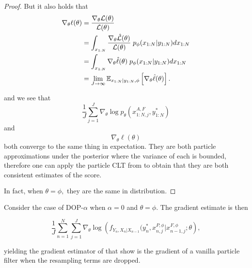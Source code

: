 \documentclass{article}
\begin{document}
\begin{proof}
    But it also holds that
    \begin{align*}
        \nabla_\theta \ell(\theta)
        &= \frac{\nabla_\theta \mathcal{L}(\theta)}{\mathcal{L}(\theta)} \\
        &= \int_{x_{1:N}} \frac{\nabla_\theta \hat{\mathcal{L}}(\theta)}{\mathcal{L}(\theta)} \;p_\phi(x_{1:N}|y_{1:N})dx_{1:N} \\
        &= \int_{x_{1:N}} \nabla_\theta \hat\ell(\theta) \;p_\phi(x_{1:N}|y_{1:N})dx_{1:N}\\
        &= \lim_{J\to\infty} \mathbb{E}_{x_{1:N}|y_{1:N}, \phi}\left[\nabla_\theta \hat\ell(\theta)\right].
    \end{align*}

    and we see that $$\frac{1}{J}\sum_{j=1}^J\nabla_\theta \log p_\theta(x_{1:N,j}^{A,F},y_{1:N}^*)$$ and $$\nabla_\theta \hat\ell(\theta)$$ both converge to the same thing in expectation. They are both particle approximations under the posterior where the variance of each is bounded, therefore one can apply the particle CLT from \cite{chopin2004clt} to obtain that they are both consistent estimates of the score.

    In fact, when $\theta=\phi,$ they are the same in distribution. 

\end{proof}


\begin{lem}

Consider the case of DOP-$\alpha$ when $\alpha=0$ and $\theta=\phi$. The gradient estimate is then

    \begin{equation}
        \frac{1}{J} \sum_{n=1}^N \sum_{j=1}^J \nabla_\theta \log\left(f_{Y_n,X_n|X_{n-1}}(y_n^*, x_{n,j}^{P, \phi}|x_{n-1,j}^{F, \phi}; \theta\right),
    \end{equation}

    yielding the gradient estimator of \cite{blei2018vsmc} that \cite{scibior2021dpf} show is the gradient of a vanilla particle filter when the resampling terms are dropped.

\end{lem}
\end{document}
